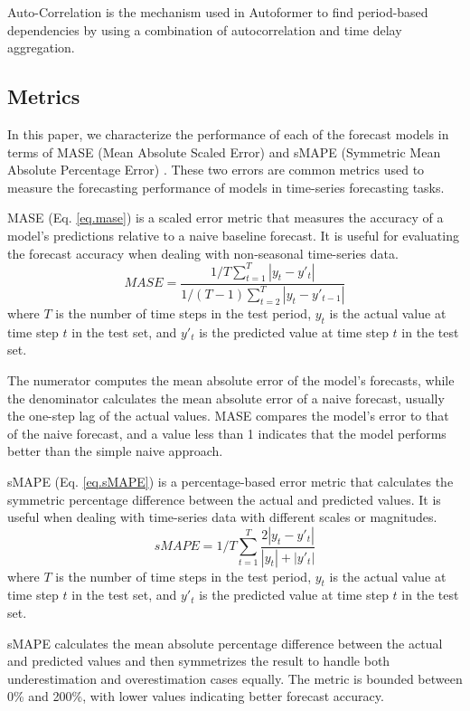 \documentclass[conference]{IEEEtran}
\begin{document}
	Auto-Correlation is the mechanism used in Autoformer to find period-based dependencies by using a combination of autocorrelation and time delay aggregation.  
	
	\subsection{Metrics}
	In this paper, we characterize the performance of each of the forecast models in terms of MASE (Mean Absolute Scaled Error) \cite{hyndman2006another} and sMAPE (Symmetric Mean Absolute Percentage Error) \cite{makridakis1993accuracy}.  These two errors are common metrics used to measure the forecasting performance of models in time-series forecasting tasks.
	
	MASE (Eq. \ref{eq.mase}) is a scaled error metric that measures the accuracy of a model's predictions relative to a naive baseline forecast. It is useful for evaluating the forecast accuracy when dealing with non-seasonal time-series data.
	\begin{equation} \label{eq.mase}
		MASE=\frac{1/T \sum_{t=1}^{T} |y_t - y'_t|}{1/(T-1) \sum_{t=2}^{T} |y_t - y'_{t-1}|}
	\end{equation}
	where $T$ is the number of time steps in the test period, $y_t$ is the actual value at time step $t$ in the test set, and $y'_t$ is the predicted value at time step $t$ in the test set.
	
	The numerator computes the mean absolute error of the model's forecasts, while the denominator calculates the mean absolute error of a naive forecast, usually the one-step lag of the actual values. MASE compares the model's error to that of the naive forecast, and a value less than 1 indicates that the model performs better than the simple naive approach.
	
	sMAPE (Eq. \ref{eq.sMAPE}) is a percentage-based error metric that calculates the symmetric percentage difference between the actual and predicted values. It is useful when dealing with time-series data with different scales or magnitudes. 
	\begin{equation} \label{eq.sMAPE}
		sMAPE=1/T \sum_{t=1}^{T} \frac{2|y_t - y'_t|}{|y_t|+|y'_t|}
	\end{equation}
	where $T$ is the number of time steps in the test period, $y_t$ is the actual value at time step $t$ in the test set, and $y'_t$ is the predicted value at time step $t$ in the test set.
	
	sMAPE calculates the mean absolute percentage difference between the actual and predicted values and then symmetrizes the result to handle both underestimation and overestimation cases equally. The metric is bounded between 0\% and 200\%, with lower values indicating better forecast accuracy.
	
\end{document}
